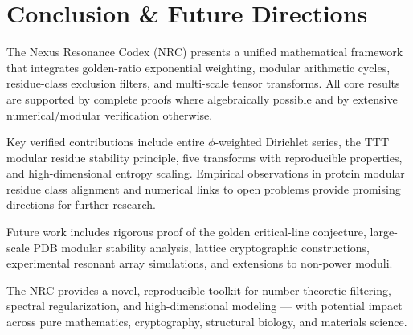 \section{Conclusion \& Future Directions}

The Nexus Resonance Codex (NRC) presents a unified mathematical framework that integrates golden-ratio exponential weighting, modular arithmetic cycles, residue-class exclusion filters, and multi-scale tensor transforms. All core results are supported by complete proofs where algebraically possible and by extensive numerical/modular verification otherwise.

Key verified contributions include entire $\phi$-weighted Dirichlet series, the TTT modular residue stability principle, five transforms with reproducible properties, and high-dimensional entropy scaling. Empirical observations in protein modular residue class alignment and numerical links to open problems provide promising directions for further research.

Future work includes rigorous proof of the golden critical-line conjecture, large-scale PDB modular stability analysis, lattice cryptographic constructions, experimental resonant array simulations, and extensions to non-power moduli.

The NRC provides a novel, reproducible toolkit for number-theoretic filtering, spectral regularization, and high-dimensional modeling --- with potential impact across pure mathematics, cryptography, structural biology, and materials science.